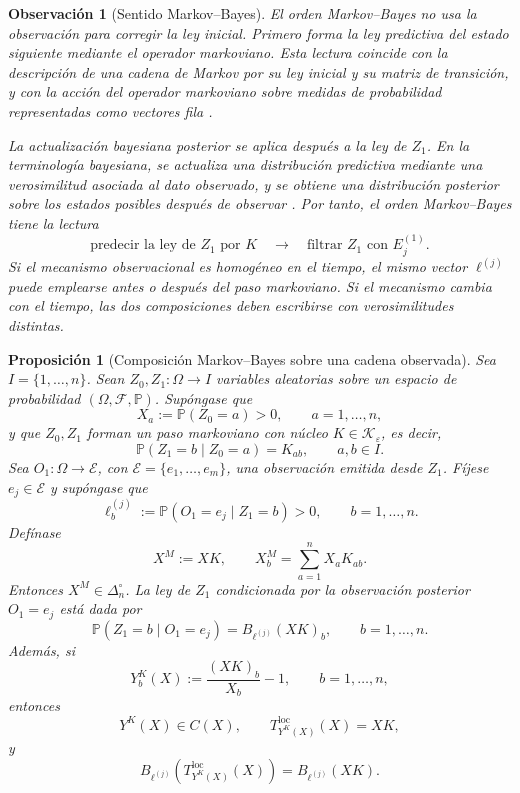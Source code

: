 ﻿\documentclass[12pt]{article}
\newtheorem{proposicion}{Proposición}[section]
\newtheorem{observacion}{Observación}[section]
\begin{document}
\begin{observacion}[Sentido Markov--Bayes]
El orden Markov--Bayes no usa la observación para corregir la ley inicial. Primero forma la ley predictiva del estado siguiente mediante el operador markoviano. Esta lectura coincide con la descripción de una cadena de Markov por su ley inicial y su matriz de transición, y con la acción del operador markoviano sobre medidas de probabilidad representadas como vectores fila \citep{Norris1997,GaubertQu2014}.

La actualización bayesiana posterior se aplica después a la ley de \(Z_1\). En la terminología bayesiana, se actualiza una distribución predictiva mediante una verosimilitud asociada al dato observado, y se obtiene una distribución posterior sobre los estados posibles después de observar \citep{Sprungk2020}. Por tanto, el orden Markov--Bayes tiene la lectura
\[
\text{predecir la ley de }Z_1\text{ por }K
\quad\longrightarrow\quad
\text{filtrar }Z_1\text{ con }E_j^{(1)}.
\]
Si el mecanismo observacional es homogéneo en el tiempo, el mismo vector \(\ell^{(j)}\) puede emplearse antes o después del paso markoviano. Si el mecanismo cambia con el tiempo, las dos composiciones deben escribirse con verosimilitudes distintas.
\end{observacion}

\begin{proposicion}[Composición Markov--Bayes sobre una cadena observada]
\label{prop:composicion_MB_kolmogorov}
Sea \(I=\{1,\dots,n\}\). Sean \(Z_0,Z_1:\Omega\to I\) variables aleatorias sobre un espacio de probabilidad \((\Omega,\mathcal F,\mathbb P)\). Supóngase que
\[
X_a:=\mathbb P(Z_0=a)>0,
\qquad a=1,\dots,n,
\]
y que \(Z_0,Z_1\) forman un paso markoviano con núcleo \(K\in\mathcal K_\varepsilon\), es decir,
\[
\mathbb P(Z_1=b\mid Z_0=a)=K_{ab},
\qquad a,b\in I.
\]
Sea \(O_1:\Omega\to\mathcal E\), con \(\mathcal E=\{e_1,\dots,e_m\}\), una observación emitida desde \(Z_1\). Fíjese \(e_j\in\mathcal E\) y supóngase que
\[
\ell_b^{(j)}
:=
\mathbb P(O_1=e_j\mid Z_1=b)>0,
\qquad b=1,\dots,n.
\]
Defínase
\[
X^M:=XK,
\qquad
X_b^M=\sum_{a=1}^nX_aK_{ab}.
\]
Entonces \(X^M\in\Delta_n^\circ\). La ley de \(Z_1\) condicionada por la observación posterior \(O_1=e_j\) está dada por
\[
\mathbb P(Z_1=b\mid O_1=e_j)
=
B_{\ell^{(j)}}(XK)_b,
\qquad b=1,\dots,n.
\]
Además, si
\[
Y_b^K(X):=
\frac{(XK)_b}{X_b}-1,
\qquad b=1,\dots,n,
\]
entonces
\[
Y^K(X)\in C(X),
\qquad
T^{\mathrm{loc}}_{Y^K(X)}(X)=XK,
\]
y
\[
B_{\ell^{(j)}}\!\left(T^{\mathrm{loc}}_{Y^K(X)}(X)\right)
=
B_{\ell^{(j)}}(XK).
\]
\end{proposicion}
\end{document}
